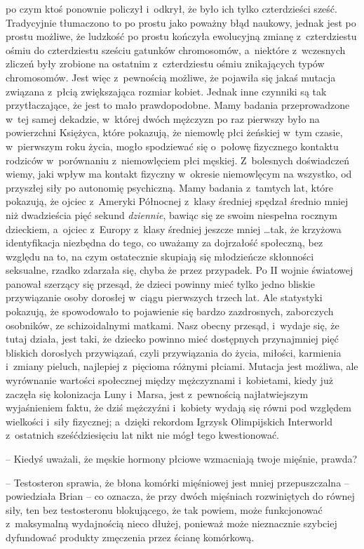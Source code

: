 \documentclass[oneside,polish,11pt,rmheadings]{mwbk}
\begin{document}
po czym ktoś ponownie policzył i~odkrył, że było ich tylko czterdzieści sześć. Tradycyjnie tłumaczono to po prostu jako poważny błąd naukowy, jednak jest po prostu możliwe, że ludzkość po prostu kończyła ewolucyjną zmianę z~czterdziestu ośmiu do czterdziestu sześciu gatunków chromosomów, a~niektóre z~wczesnych zliczeń  były zrobione na ostatnim z~czterdziestu ośmiu znikających typów chromosomów. Jest więc z~pewnością możliwe, że pojawiła się jakaś mutacja związana z~płcią zwiększająca rozmiar kobiet. Jednak inne czynniki są tak przytłaczające, że jest to mało prawdopodobne. Mamy badania przeprowadzone w~tej samej dekadzie, w~której dwóch mężczyzn po raz pierwszy było na powierzchni Księżyca, które pokazują, że niemowlę płci żeńskiej w~tym czasie, w~pierwszym roku życia, mogło spodziewać się o~połowę fizycznego kontaktu rodziców w~porównaniu z~niemowlęciem płci męskiej. Z~bolesnych doświadczeń wiemy, jaki wpływ ma kontakt fizyczny w~okresie niemowlęcym na wszystko, od przyszłej siły po autonomię psychiczną. Mamy badania z~tamtych lat, które pokazują, że ojciec z~Ameryki Północnej z~klasy średniej spędzał średnio mniej niż dwadzieścia pięć sekund \textit{dziennie}, bawiąc się ze swoim niespełna rocznym dzieckiem, a~ojciec z~Europy z~klasy średniej jeszcze mniej \ldots  tak, że krzyżowa identyfikacja niezbędna do tego, co uważamy za dojrzałość społeczną, bez względu na to, na czym ostatecznie skupiają się młodzieńcze skłonności seksualne, rzadko zdarzała się, chyba że przez przypadek. Po II wojnie światowej panował szerzący się przesąd, że dzieci powinny mieć tylko jedno bliskie przywiązanie osoby dorosłej w~ciągu pierwszych trzech lat. Ale statystyki pokazują, że spowodowało to pojawienie się bardzo zazdrosnych, zaborczych osobników, ze schizoidalnymi matkami. Nasz obecny przesąd, i~wydaje się, że tutaj działa, jest taki, że dziecko powinno mieć dostępnych przynajmniej pięć bliskich dorosłych przywiązań, czyli przywiązania do życia, miłości, karmienia i~zmiany pieluch, najlepiej z~pięcioma różnymi płciami. Mutacja jest możliwa, ale wyrównanie wartości społecznej między mężczyznami i~kobietami, kiedy już zaczęła się kolonizacja Luny i~Marsa, jest z~pewnością najłatwiejszym wyjaśnieniem faktu, że dziś mężczyźni i~kobiety wydają się równi pod względem wielkości i~siły fizycznej; a~dzięki rekordom Igrzysk Olimpijskich Interworld z~ostatnich sześćdziesięciu lat nikt nie mógł tego kwestionować. 

-- Kiedyś uważali, że męskie hormony płciowe wzmacniają twoje mięśnie, prawda? 

-- Testosteron sprawia, że błona komórki mięśniowej jest mniej przepuszczalna -- powiedziała Brian -- co oznacza, że przy dwóch mięśniach rozwiniętych do równej siły, ten bez testosteronu blokującego, że tak powiem, może funkcjonować z~maksymalną wydajnością nieco dłużej, ponieważ może nieznacznie szybciej dyfundować produkty zmęczenia przez ścianę komórkową. 
\end{document}
